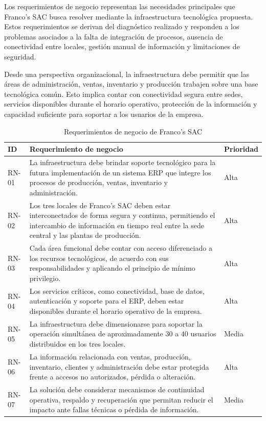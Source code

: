 \documentclass[11pt, a4paper, oneside]{report}
\begin{document}
Los requerimientos de negocio representan las necesidades principales que Franco's SAC busca resolver mediante la infraestructura tecnológica propuesta. Estos requerimientos se derivan del diagnóstico realizado y responden a los problemas asociados a la falta de integración de procesos, ausencia de conectividad entre locales, gestión manual de información y limitaciones de seguridad.

Desde una perspectiva organizacional, la infraestructura debe permitir que las áreas de administración, ventas, inventario y producción trabajen sobre una base tecnológica común. Esto implica contar con conectividad segura entre sedes, servicios disponibles durante el horario operativo, protección de la información y capacidad suficiente para soportar a los usuarios de la empresa.

\begin{table}[htbp]
\centering
\caption{Requerimientos de negocio de Franco's SAC}
\small
\renewcommand{\arraystretch}{1.25}
\begin{tabularx}{\textwidth}{|N{1.6cm}|X|N{2cm}|}
\hline
{}
\textbf{ID} & \textbf{Requerimiento de negocio} & \textbf{Prioridad} \\
\hline
RN-01 & La infraestructura debe brindar soporte tecnológico para la futura implementación de un sistema ERP que integre los procesos de producción, ventas, inventario y administración. & Alta \\
\hline
RN-02 & Los tres locales de Franco's SAC deben estar interconectados de forma segura y continua, permitiendo el intercambio de información en tiempo real entre la sede central y las plantas de producción. & Alta \\
\hline
RN-03 & Cada área funcional debe contar con acceso diferenciado a los recursos tecnológicos, de acuerdo con sus responsabilidades y aplicando el principio de mínimo privilegio. & Alta \\
\hline
RN-04 & Los servicios críticos, como conectividad, base de datos, autenticación y soporte para el ERP, deben estar disponibles durante el horario operativo de la empresa. & Alta \\
\hline
RN-05 & La infraestructura debe dimensionarse para soportar la operación simultánea de aproximadamente 30 a 40 usuarios distribuidos en los tres locales. & Media \\
\hline
RN-06 & La información relacionada con ventas, producción, inventario, clientes y administración debe estar protegida frente a accesos no autorizados, pérdida o alteración. & Alta \\
\hline
RN-07 & La solución debe considerar mecanismos de continuidad operativa, respaldo y recuperación que permitan reducir el impacto ante fallas técnicas o pérdida de información. & Media \\
\hline
\end{tabularx}
\end{table}
\end{document}
